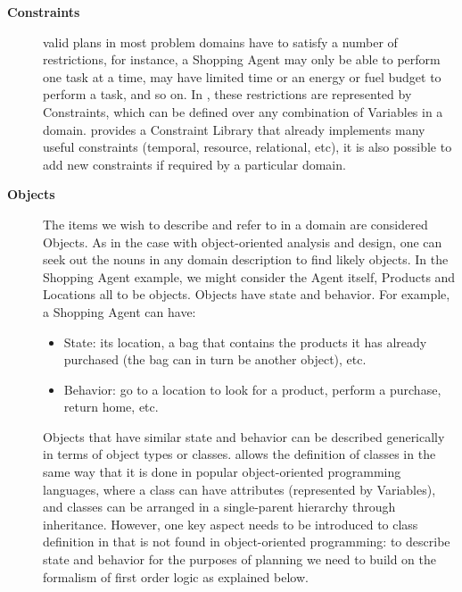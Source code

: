 \begin{description}
\item[\textbf{Constraints}] valid plans in most problem domains have
  to satisfy a number of restrictions, for instance, a Shopping Agent
  may only be able to perform one task at a time, may have limited
  time or an energy or fuel budget to perform a task, and so on. In
  \eu, these restrictions are represented by Constraints, which can be
  defined over any combination of Variables in a domain. \eu provides
  a Constraint Library that already implements many useful constraints
  (temporal, resource, relational, etc), it is also possible to add
  new constraints if required by a particular domain.

\item[\textbf{Objects}] The items we wish to describe and refer to in
  a domain are considered Objects. As in the case with object-oriented
  analysis and design, one can seek out the nouns in any domain
  description to find likely objects. In the Shopping Agent example,
  we might consider the Agent itself, Products and Locations all to be
  objects. Objects have state and behavior. For example, a Shopping
  Agent can have:

  \begin{itemize}

  \item State: its location, a bag that contains the products it has
    already purchased (the bag can in turn be another object), etc.

  \item Behavior: go to a location to look for a product, perform a
    purchase, return home, etc.

  \end{itemize}

  Objects that have similar state and behavior can be described
  generically in terms of object types or classes. \eu allows the
  definition of classes in the same way that it is done in popular
  object-oriented programming languages, where a class can have
  attributes (represented by Variables), and classes can be arranged
  in a single-parent hierarchy through inheritance.  However, one key
  aspect needs to be introduced to class definition in \eu that is not
  found in object-oriented programming: to describe state and behavior
  for the purposes of planning we need to build on the formalism of
  first order logic as explained below.


\end{description}
